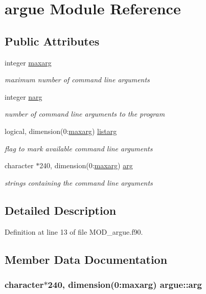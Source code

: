 \hypertarget{classargue}{\section{argue Module Reference}
\label{classargue}
}
\subsection*{Public Attributes}
\begin{DoxyCompactItemize}
\item 
integer \hyperlink{classargue_a9f728a4838a5af0e2a9763f9b627447a}{maxarg}
\begin{DoxyCompactList}\small\item\em maximum number of command line arguments \end{DoxyCompactList}\item 
integer \hyperlink{classargue_a9ae8afb4911a2aa1af3126c1e5e037f5}{narg}
\begin{DoxyCompactList}\small\item\em number of command line arguments to the program \end{DoxyCompactList}\item 
logical, dimension(0\-:\hyperlink{classargue_a9f728a4838a5af0e2a9763f9b627447a}{maxarg}) \hyperlink{classargue_a978200cf4ce618c6681ea64c7203b3ea}{listarg}
\begin{DoxyCompactList}\small\item\em flag to mark available command line arguments \end{DoxyCompactList}\item 
character $\ast$240, dimension(0\-:\hyperlink{classargue_a9f728a4838a5af0e2a9763f9b627447a}{maxarg}) \hyperlink{classargue_a0081f494a6484b076be87e1f525a619f}{arg}
\begin{DoxyCompactList}\small\item\em strings containing the command line arguments \end{DoxyCompactList}\end{DoxyCompactItemize}


\subsection{Detailed Description}


Definition at line 13 of file M\-O\-D\-\_\-argue.\-f90.



\subsection{Member Data Documentation}
\hypertarget{classargue_a0081f494a6484b076be87e1f525a619f}{
\subsubsection[{arg}]{\setlength{\rightskip}{0pt plus 5cm}character$\ast$240, dimension(0\-:{\bf maxarg}) argue\-::arg}}\label{classargue_a0081f494a6484b076be87e1f525a619f}


